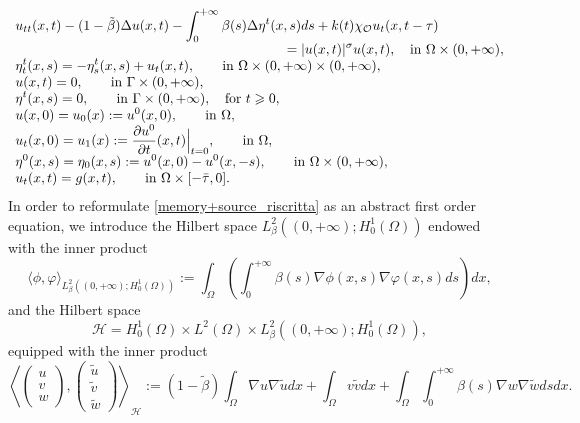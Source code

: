 \documentclass[11pt]{article}
\renewcommand{\geq}{\geqslant}
\begin{document}
\begin{equation}
\label{memory+source_riscritta}
\begin{array}{l}
\displaystyle{ u_{tt}(x,t)-(1-\tilde{\beta})\Delta u(x,t)-\int_0^{+\infty} \beta(s)\Delta \eta^t(x,s) ds+k(t)\chi _{\mathcal{O}} u_t(x,t-\tau)}\\
\hspace{7 cm}
\displaystyle{=|u(x,t)|^\sigma u(x,t), \quad \text{in} \ \Omega\times (0,+\infty),}\\
\displaystyle{\eta_t^t(x,s)=-\eta_s^t(x,s)+u_t(x,t), \qquad \text{in} \ \Omega\times (0,+\infty)\times (0,+\infty),}\\
\displaystyle{ u(x,t)=0, \qquad \text{in} \ \Gamma \times (0,+\infty),}\\
\displaystyle{ \eta^t(x,s)=0, \qquad \text{in} \ \Gamma \times (0,+\infty), \quad \text{for} \ t\geq 0,}\\
\displaystyle{ u(x,0)=u_0(x):=u^0(x,0), \qquad \text{in} \ \Omega,}\\
\displaystyle{ u_t(x,0)=u_1(x):=\frac{\partial u^0}{\partial t}(x,t)\Bigr| _{t=0}, \qquad \text{in} \ \Omega,}\\
\displaystyle{ \eta^0(x,s)=\eta_0(x,s):=u^0(x,0)-u^0(x,-s), \qquad \text{in} \ \Omega\times (0,+\infty),}\\
\displaystyle{ u_t(x,t)=g(x,t), \qquad \text{in} \ \Omega\times [-\bar\tau,0].}

\end{array}
\end{equation}
In order to reformulate \eqref{memory+source_riscritta} as an abstract first order equation, we introduce the Hilbert space $L^2_\beta ((0,+\infty);H^1_0(\Omega))$ endowed with the inner product
$$
\langle \phi , \varphi\rangle _{L^2_\beta ((0,+\infty);H^1_0(\Omega))} := \int_{\Omega} \left( \int_0^{+\infty} \beta(s) \nabla \phi (x,s) \nabla \varphi (x,s) ds \right) dx,
$$
and the Hilbert space
$$
\mathcal{H}=H_0^1(\Omega)\times L^2(\Omega) \times L^2_\beta ((0,+\infty);H^1_0(\Omega)),
$$
equipped with the inner product
\begin{equation*}
\left\langle
\left (
\begin{array}{l}
u\\
v\\
w
\end{array}
\right ),
\left (
\begin{array}{l}
\tilde u\\
\tilde v\\
\tilde w
\end{array}
\right )
\right\rangle_{\mathcal{H}}:=(1-\tilde{\beta}) \int_{\Omega} \nabla u \nabla \tilde u dx +\int_{\Omega} v\tilde v dx+ \int_{\Omega} \int_0^{+\infty} \beta(s) \nabla w \nabla \tilde w ds dx.
\end{equation*}
\end{document}
